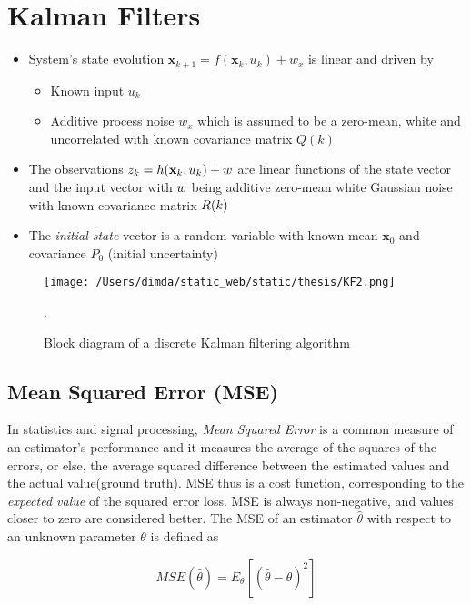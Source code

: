 \section{Kalman Filters}

\begin{itemize}
	\item System's state evolution $\mathbf{x}_{k+1} = f(\mathbf{x}_k,u_k) + w_{\textit{x}}$ is linear and driven by
	\begin{itemize}
		\item Known input $u_k$
		\item Additive process noise $w_{\textit{x}}$ which is assumed to be a zero-mean, white and uncorrelated with known covariance matrix $Q(k)$
	\end{itemize}
	\item The observations $ z_k = h(\mathbf{x}_k,u_k) + {w} $  are linear functions of the state vector and the input vector with ${w}$ being additive zero-mean white Gaussian noise with known covariance matrix ${R}(k)$
	
	\item The \emph{initial state} vector is a random variable with known mean $\mathbf{x}_0$ and covariance $P_0$ (initial uncertainty)
\end{itemize}


\begin{figure}[H]
	\centering
	\texttt{[image: /Users/dimda/static\_web/static/thesis/KF2.png]}
	\caption{Block diagram of a discrete Kalman filtering algorithm}.
	\label{fig:state_vector}
\end{figure}

\subsection{Mean Squared Error (MSE)}
In statistics and signal processing, \emph{Mean Squared Error} is a common measure of an estimator's performance and it measures the average of the squares of the errors, or else, the average squared difference between the estimated values and the actual value(ground truth). MSE thus is a cost function, corresponding to the \emph{expected value} of the squared error loss. MSE is always non-negative, and values closer to zero are considered better. The MSE of an estimator $\hat{\theta}$ with respect to an unknown parameter $\theta$ is defined as 

\[ MSE(\hat{\theta}) = E_{\theta}\left[(\hat{\theta}-\theta)^2\right] \]

